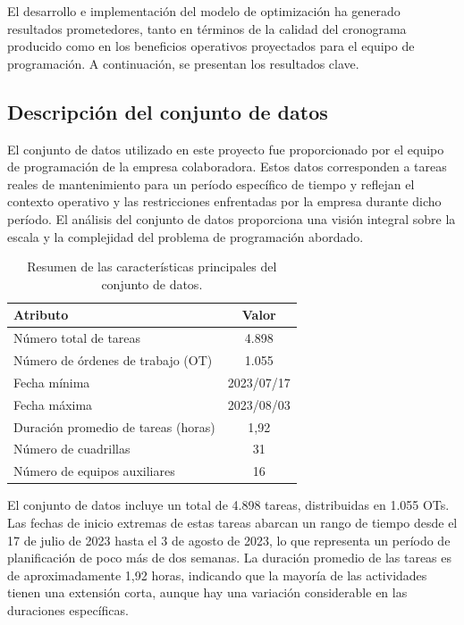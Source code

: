 \documentclass{article}
\begin{document}
El desarrollo e implementación del modelo de optimización ha generado resultados prometedores, tanto en términos de la calidad del cronograma producido como en los beneficios operativos proyectados para el equipo de programación. A continuación, se presentan los resultados clave.


\subsection{Descripción del conjunto de datos}

El conjunto de datos utilizado en este proyecto fue proporcionado por el equipo de programación de la empresa colaboradora. Estos datos corresponden a tareas reales de mantenimiento para un período específico de tiempo y reflejan el contexto operativo y las restricciones enfrentadas por la empresa durante dicho período. El análisis del conjunto de datos proporciona una visión integral sobre la escala y la complejidad del problema de programación abordado.

\begin{table}[htbp]
    \centering
    \begin{tabular}{lc}
        \toprule
        \textbf{Atributo} & \textbf{Valor} \\
        \midrule
        Número total de tareas & 4.898 \\
        Número de órdenes de trabajo (OT) & 1.055 \\
        Fecha mínima & 2023/07/17 \\
        Fecha máxima & 2023/08/03 \\
        Duración promedio de tareas (horas) & 1,92 \\
        Número de cuadrillas & 31 \\
        Número de equipos auxiliares & 16 \\
        \bottomrule
    \end{tabular}
    \caption{Resumen de las características principales del conjunto de datos.}
    \label{tab:dataset_summary}
\end{table}


El conjunto de datos incluye un total de 4.898 tareas, distribuidas en 1.055 OTs. Las fechas de inicio extremas de estas tareas abarcan un rango de tiempo desde el 17 de julio de 2023 hasta el 3 de agosto de 2023, lo que representa un período de planificación de poco más de dos semanas. La duración promedio de las tareas es de aproximadamente 1,92 horas, indicando que la mayoría de las actividades tienen una extensión corta, aunque hay una variación considerable en las duraciones específicas.
\end{document}
